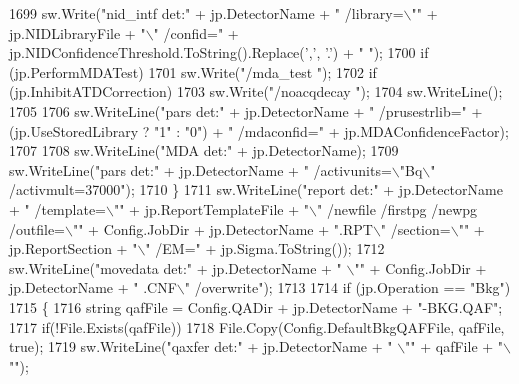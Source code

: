 \begin{DoxyCode}
1699                 sw.Write(\textcolor{stringliteral}{"nid\_intf det:"} + jp.DetectorName + \textcolor{stringliteral}{" /library=\(\backslash\)""} + jp.NIDLibraryFile + \textcolor{stringliteral}{"\(\backslash\)"
       /confid="} + jp.NIDConfidenceThreshold.ToString().Replace(\textcolor{charliteral}{','}, \textcolor{charliteral}{'.'}) + \textcolor{stringliteral}{" "});
1700                 \textcolor{keywordflow}{if} (jp.PerformMDATest)
1701                     sw.Write(\textcolor{stringliteral}{"/mda\_test "});
1702                 \textcolor{keywordflow}{if} (jp.InhibitATDCorrection)
1703                     sw.Write(\textcolor{stringliteral}{"/noacqdecay "});
1704                 sw.WriteLine();
1705 
1706                 sw.WriteLine(\textcolor{stringliteral}{"pars det:"} + jp.DetectorName + \textcolor{stringliteral}{" /prusestrlib="} + (jp.UseStoredLibrary ? \textcolor{stringliteral}{"1"} 
      : \textcolor{stringliteral}{"0"}) + \textcolor{stringliteral}{" /mdaconfid="} + jp.MDAConfidenceFactor);
1707 
1708                 sw.WriteLine(\textcolor{stringliteral}{"MDA det:"} + jp.DetectorName);
1709                 sw.WriteLine(\textcolor{stringliteral}{"pars det:"} + jp.DetectorName + \textcolor{stringliteral}{" /activunits=\(\backslash\)"Bq\(\backslash\)" /activmult=37000"});
1710             \}
1711             sw.WriteLine(\textcolor{stringliteral}{"report det:"} + jp.DetectorName + \textcolor{stringliteral}{" /template=\(\backslash\)""} + jp.ReportTemplateFile + \textcolor{stringliteral}{"\(\backslash\)"
       /newfile /firstpg /newpg /outfile=\(\backslash\)""} + Config.JobDir + jp.DetectorName + \textcolor{stringliteral}{".RPT\(\backslash\)" /section=\(\backslash\)""} + 
      jp.ReportSection + \textcolor{stringliteral}{"\(\backslash\)" /EM="} + jp.Sigma.ToString());
1712             sw.WriteLine(\textcolor{stringliteral}{"movedata det:"} + jp.DetectorName + \textcolor{stringliteral}{" \(\backslash\)""} + Config.JobDir + jp.DetectorName + \textcolor{stringliteral}{"
      .CNF\(\backslash\)" /overwrite"});
1713 
1714             \textcolor{keywordflow}{if} (jp.Operation == \textcolor{stringliteral}{"Bkg"})
1715             \{
1716                 \textcolor{keywordtype}{string} qafFile = Config.QADir + jp.DetectorName + \textcolor{stringliteral}{"-BKG.QAF"};
1717                 \textcolor{keywordflow}{if}(!File.Exists(qafFile))
1718                     File.Copy(Config.DefaultBkgQAFFile, qafFile, \textcolor{keyword}{true});
1719                 sw.WriteLine(\textcolor{stringliteral}{"qaxfer det:"} + jp.DetectorName + \textcolor{stringliteral}{" \(\backslash\)""} + qafFile + \textcolor{stringliteral}{"\(\backslash\)""});

\end{DoxyCode}
